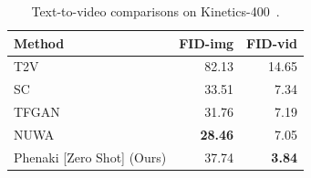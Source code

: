 \begin{table}
\small
\caption{Text-to-video comparisons on Kinetics-400~\cite{Kinetics400}.}
\vspace{-.3cm}
\label{table:t2v_comp}
\begin{center}
\begin{tabular}{lrr}
Method  & FID-img  & FID-vid  \\
\hline
T2V \cite{vidgenfromtext}     & 82.13 & 14.65 \\
SC \cite{tfgan}                 & 33.51 & 7.34 \\
TFGAN \cite{tfgan}                   & 31.76 & 7.19 \\
NUWA                      & \textbf{28.46} & 7.05 \\
\hline
Phenaki [Zero Shot] (Ours)            & 37.74 & \textbf{3.84} \\
\end{tabular}
\end{center}
\end{table}